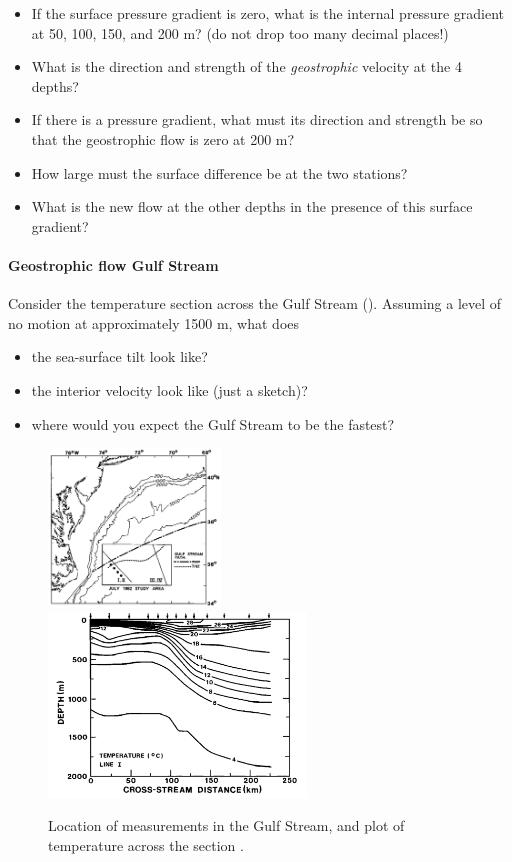 \begin{itemize}
  \item If the surface pressure gradient is zero, what is the internal pressure gradient at 50, 100, 150, and 200 m? (do not drop too many decimal places!)
  \item What is the direction and strength of the \emph{geostrophic} velocity at the 4 depths?
  \item If there is a pressure gradient, what must its direction and strength be so that the geostrophic flow is zero at 200 m?
  \item How large must the surface difference be at the two stations? 
  \item What is the new flow at the other depths in the presence of this surface gradient?
\end{itemize}

\paragraph{Geostrophic flow Gulf Stream}

Consider the temperature section across the Gulf Stream ().  Assuming a level of no motion at approximately 1500 m, what does 
\begin{itemize}
    \item the sea-surface tilt look like?
    \item the interior velocity look like (just a sketch)?
    \item where would you expect the Gulf Stream to be the fastest?
\end{itemize}

\begin{figure}[hbt]
  \begin{center}
    \includegraphics[width=1.8in]{figs/Geostrophic/GulfStreamLoc}
    \includegraphics[width=2.7in]{figs/Geostrophic/GulfStreamTemp}
    \caption{Location of measurements in the Gulf Stream, and plot of temperature across the section \citep{johnsetal95}.}
    \label{fig:GulfStreamExample}  
  \end{center}
\end{figure}


